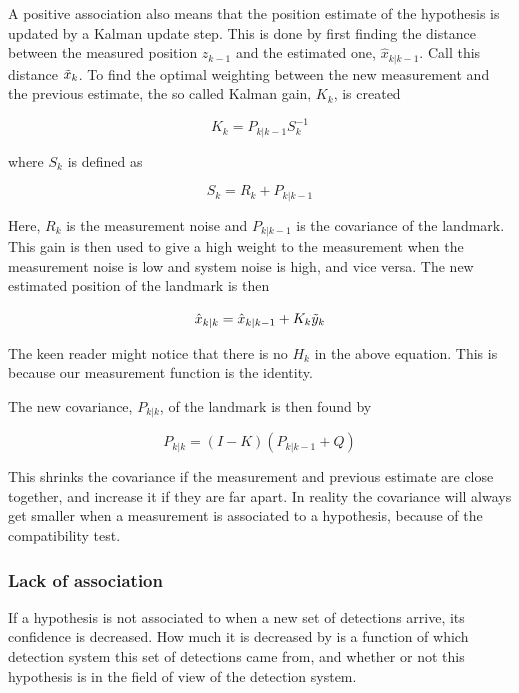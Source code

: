 A positive association also means that the position estimate of the hypothesis is updated by a Kalman update step. This is done by first finding the distance between the measured position $z_{k-1}$ and the estimated one, $\hat{x}_{k|k-1}$. Call this distance $\Tilde{x}_k$. To find the optimal weighting between the new measurement and the previous estimate, the so called Kalman gain, $K_k$, is created

\begin{equation}
    K_k = P_{k|k-1}S^{-1}_k
\end{equation}

where $S_k$ is defined as 

\begin{equation}
    S_k = R_k + P_{k|k-1}
\end{equation}

Here, $R_k$ is the measurement noise and $P_{k|k-1}$ is the covariance of the landmark. This gain is then used to give a high weight to the measurement when the measurement noise is low and system noise is high, and vice versa. The new estimated position of the landmark is then

\begin{equation}
    \hat{x}_{k|k} = \hat{x}_{k|k-1} + K_k\Tilde{y}_k
\end{equation}

The keen reader might notice that there is no $H_k$ in the above equation. This is because our measurement function is the identity. 

The new covariance, $P_{k|k}$, of the landmark is then found by  

\begin{equation}
    P_{k|k} = (I-K)(P_{k|k-1} + Q)
\end{equation}

This shrinks the covariance if the measurement and previous estimate are close together, and increase it if they are far apart. In reality the covariance will always get smaller when a measurement is associated to a hypothesis, because of the compatibility test. 

\subsubsection{Lack of association}

If a hypothesis is not associated to when a new set of detections arrive, its confidence is decreased. How much it is decreased by is a function of which detection system this set of detections came from, and whether or not this hypothesis is in the field of view of the detection system. 

